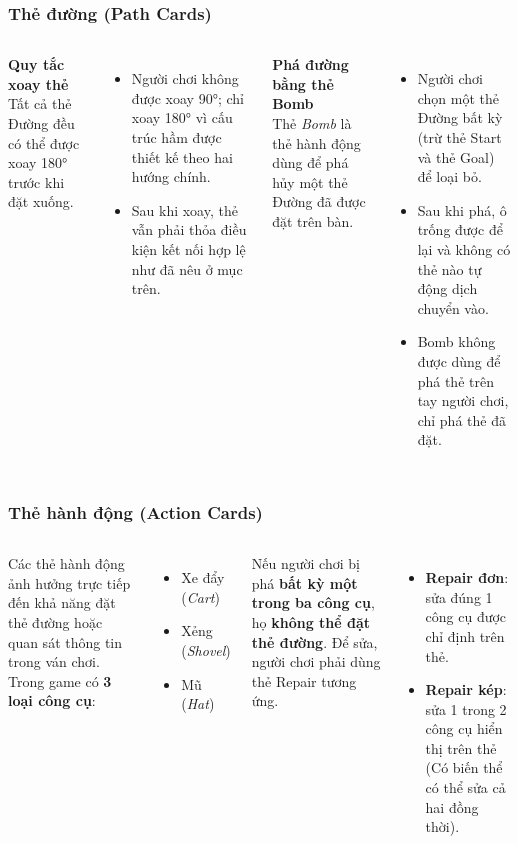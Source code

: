 \begin{frame}
\frametitle{Thẻ đường (Path Cards)}

\begin{columns}
    \textbf{Quy tắc xoay thẻ}  \\
    Tất cả thẻ Đường đều có thể được xoay 180° trước khi đặt xuống.  
    \begin{itemize}
        \item Người chơi không được xoay 90°; chỉ xoay 180° vì cấu trúc hầm được thiết kế theo hai hướng chính.
        \item Sau khi xoay, thẻ vẫn phải thỏa điều kiện kết nối hợp lệ như đã nêu ở mục trên.
    \end{itemize}



    \textbf{Phá đường bằng thẻ Bomb}  \\
    Thẻ \emph{Bomb} là thẻ hành động dùng để phá hủy một thẻ Đường đã được đặt trên bàn.
    \begin{itemize}
        \item Người chơi chọn một thẻ Đường bất kỳ (trừ thẻ Start và thẻ Goal) để loại bỏ.
        \item Sau khi phá, ô trống được để lại và không có thẻ nào tự động dịch chuyển vào.
        \item Bomb không được dùng để phá thẻ trên tay người chơi, chỉ phá thẻ đã đặt.
    \end{itemize}
\end{columns}
\end{frame}


\begin{frame}
\frametitle{Thẻ hành động (Action Cards)}

\begin{columns}
    
    Các thẻ hành động ảnh hưởng trực tiếp đến khả năng đặt thẻ đường hoặc quan sát thông tin trong ván chơi.  
    Trong game có \textbf{3 loại công cụ}: 
    \begin{itemize}
        \item Xe đẩy (\textit{Cart})
        \item Xẻng (\textit{Shovel})
        \item Mũ (\textit{Hat})
    \end{itemize}

    Nếu người chơi bị phá \textbf{bất kỳ một trong ba công cụ}, họ \textbf{không thể đặt thẻ đường}.  
    Để sửa, người chơi phải dùng thẻ Repair tương ứng.

    \begin{itemize}
        \item \textbf{Repair đơn}: sửa đúng 1 công cụ được chỉ định trên thẻ.
        \item \textbf{Repair kép}: sửa 1 trong 2 công cụ hiển thị trên thẻ (Có biến thể có thể sửa cả hai đồng thời).
    \end{itemize}
\end{columns}
\end{frame}

